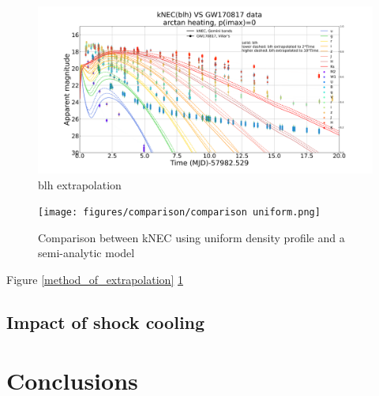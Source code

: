 \documentclass[fleqn,usenatbib]{mnras}
\begin{document}
\begin{figure}
\centering
\includegraphics[scale=0.25]{figures/blh_sfho_extrapolation/ABmags_blh_extrapolation_GW170817}
\caption{blh extrapolation}
\label{blh_extrapolation}
\end{figure}

\begin{figure}
\centering
\texttt{[image: figures/comparison/comparison uniform.png]}
\caption{Comparison between kNEC using uniform density profile and a semi-analytic model}
\label{comparison_Ricigliano}
\end{figure}

Figure \ref{method_of_extrapolation} \ref{blh_extrapolation}


\subsection{Impact of shock cooling}

\section{Conclusions}





\bsp	%
\label{lastpage}
\end{document}
